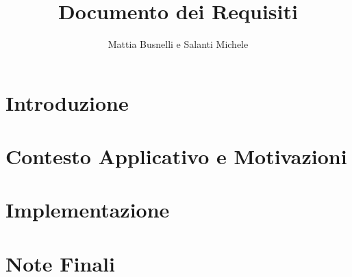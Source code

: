 \documentclass{report}
\title{Documento dei Requisiti}
\author{Mattia Busnelli e Salanti Michele}
\begin{document}


\renewcommand{\cftsecleader}{\cftdotfill{\cftdotsep}}
\tableofcontents


\chapter{Introduzione}


\chapter{Contesto Applicativo e Motivazioni}


\chapter{Implementazione}


\chapter{Note Finali}




\end{document}
